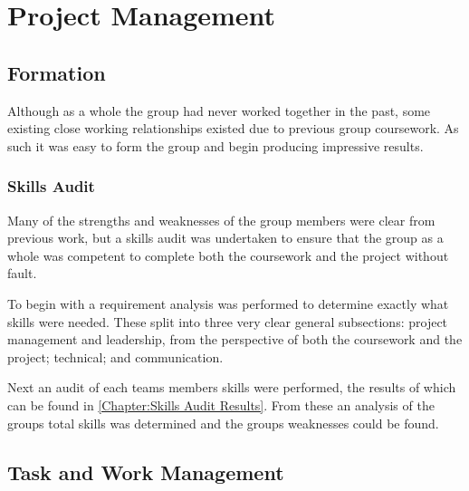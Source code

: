 \chapter{Project Management} 
\label{Chapter: Project Management}


\section{Formation} 
\label{Section:Formation}

Although as a whole the group had never worked together in the past, some existing close working relationships existed due to previous group coursework. As such it was easy to form the group and begin producing impressive results.

\subsection{Skills Audit} 
\label{Section:Skills Audit}

Many of the strengths and weaknesses of the group members were clear from previous work, but a skills audit was undertaken to ensure that the group as a whole was competent to complete both the coursework and the project without fault.

To begin with a requirement analysis was performed to determine exactly what skills were needed. These split into three very clear general subsections: project management and leadership, from the perspective of both the coursework and the project; technical; and communication. 

Next an audit of each teams members skills were performed, the results of which can be found in \autoref{Chapter:Skills Audit Results}. From these an analysis of the groups total skills was determined and the groups weaknesses could be found.

\section{Task and Work Management} 
\label{Section:Task and Work Management}

